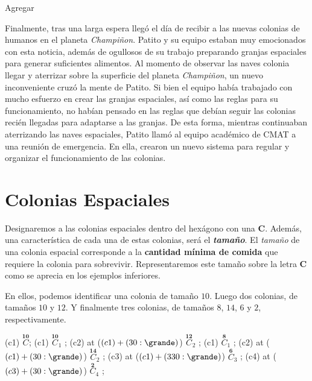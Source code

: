 \begin{solgrupal}
Agregar
\end{solgrupal}

\vspace{20mm}

\noindent Finalmente, tras una larga espera llegó el día de recibir a las nuevas colonias de humanos en el planeta \emph{Champiñon}. Patito y su equipo estaban muy emocionados con esta noticia, %
además de ogullosos de su trabajo preparando granjas espaciales para generar suficientes alimentos. Al momento de observar las naves colonia llegar y aterrizar sobre la superficie del planeta %
\emph{Champiñon}, un nuevo inconveniente cruzó la mente de Patito. Si bien el equipo había trabajado con mucho esfuerzo en crear las granjas espaciales, así como las reglas para su funcionamiento, %
no habían pensado en las reglas que debían seguir las colonias recién llegadas para adaptarse a las granjas. De esta forma, mientras continuaban aterrizando las naves espaciales, Patito llamó al %
equipo académico de CMAT a una reunión de emergencia. En ella, crearon un nuevo sistema para regular y organizar el funcionamiento de las colonias.

\section*{Colonias Espaciales}

\noindent Designaremos a las colonias espaciales dentro del hexágono con una $\mathbf{C}$. Además, una característica de cada una de estas colonias, será el \emph{\textbf{tamaño}}. El \emph{tamaño} de una colonia espacial %
corresponde a la \textbf{cantidad mínima de comida} que requiere la colonia para sobrevivir. Representaremos este tamaño sobre la letra $\mathbf{C}$ como se aprecia en los ejemplos inferiores.

\noindent En ellos, podemos identificar una colonia de tamaño $10$. Luego dos colonias, de tamaños $10$ y $12$. Y finalmente tres colonias, de tamaños $8$, $14$, $6$ y $2$, respectivamente.

\begin{center}
\cultivos
\granja (c1) {$\overset{\mathbf{10}}{C}$};
\finfin
\hspace{20mm}
\cultivos
\granja (c1) {$\overset{\mathbf{10}}{C}_1$} ;
\granja (c2) at ($(c1) +  (30:\grande)$) {$\overset{\mathbf{12}}{C}_2$} ;
\finfin
\hspace{20mm}
\cultivos
\granja (c1) {$\overset{\mathbf{8}}{C}_1$} ;
\granja (c2) at ($(c1) + (30:\grande)$) {$\overset{\mathbf{14}}{C}_2$} ;
\granja (c3) at ($(c1) + (330:\grande)$) {$\overset{\mathbf{6}}{C}_3$} ;
\granja (c4) at ($(c3) + (30:\grande)$) {$\overset{\mathbf{2}}{C}_4$} ;
\finfin
\end{center}

